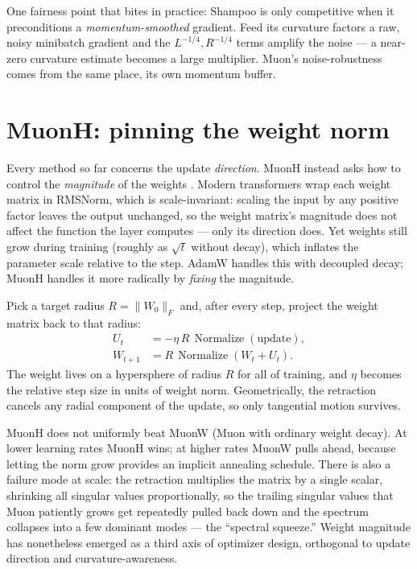 \documentclass[10pt,conference]{IEEEtran}
\begin{document}
One fairness point that bites in practice: Shampoo is only competitive when it
preconditions a \emph{momentum-smoothed} gradient. Feed its curvature factors a
raw, noisy minibatch gradient and the $L^{-1/4}, R^{-1/4}$ terms amplify the noise
--- a near-zero curvature estimate becomes a large multiplier. Muon's
noise-robustness comes from the same place, its own momentum buffer.

\section{MuonH: pinning the weight norm}
Every method so far concerns the update \emph{direction}. MuonH instead asks how
to control the \emph{magnitude} of the weights \cite{ref15}. Modern transformers
wrap each weight matrix in RMSNorm, which is scale-invariant: scaling the input by
any positive factor leaves the output unchanged, so the weight matrix's magnitude
does not affect the function the layer computes --- only its direction does. Yet
weights still grow during training (roughly as $\sqrt{t}$ without decay), which
inflates the parameter scale relative to the step. AdamW handles this with
decoupled decay; MuonH handles it more radically by \emph{fixing} the magnitude.

Pick a target radius $R=\|W_0\|_F$ and, after every step, project the weight
matrix back to that radius:
\begin{equation}
\begin{aligned}
U_t &= -\eta\, R\, \operatorname{Normalize}(\text{update}), \\
W_{t+1} &= R\, \operatorname{Normalize}(W_t + U_t).
\end{aligned}
\end{equation}
The weight lives on a hypersphere of radius $R$ for all of training, and $\eta$
becomes the relative step size in units of weight norm. Geometrically, the
retraction cancels any radial component of the update, so only tangential motion
survives.

MuonH does not uniformly beat MuonW (Muon with ordinary weight decay). At lower
learning rates MuonH wins; at higher rates MuonW pulls ahead, because letting the
norm grow provides an implicit annealing schedule. There is also a failure mode at
scale: the retraction multiplies the matrix by a single scalar, shrinking all
singular values proportionally, so the trailing singular values that Muon
patiently grows get repeatedly pulled back down and the spectrum collapses into a
few dominant modes --- the ``spectral squeeze.'' Weight magnitude has nonetheless
emerged as a third axis of optimizer design, orthogonal to update direction and
curvature-awareness.
\end{document}
